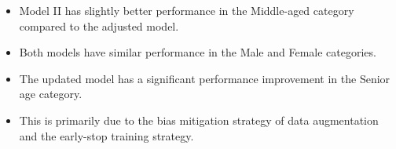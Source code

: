 \begin{itemize}
    \item Model II has slightly better performance in the Middle-aged category compared to the adjusted model.
    \item Both models have similar performance in the Male and Female categories.
    \item The updated model has a significant performance improvement in the Senior age category.
    \item This is primarily due to the bias mitigation strategy of data augmentation and the early-stop training strategy.
\end{itemize}